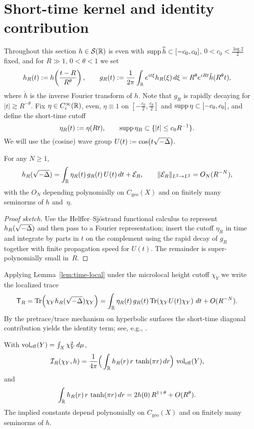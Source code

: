 \section{Short-time kernel and identity contribution}\label{sec:kernel}

Throughout this section $h\in\mathcal{S}(\mathbb{R})$ is even with $\operatorname{supp} \widehat{h}\subset[-c_0,c_0]$, $0<c_0<\tfrac{\log 2}{2}$ fixed, and for $R\gg1$, $0<\theta<1$ we set
\[
h_R(t):=h\!\left(\frac{t-R}{R^\theta}\right),\qquad
g_R(t):=\frac{1}{2\pi}\int_{\mathbb{R}}e^{it\xi}h_R(\xi)\,d\xi
=R^\theta e^{iRt}\check h(R^\theta t),
\]
where $\check h$ is the inverse Fourier transform of $h$.
Note that $g_R$ is rapidly decaying for $|t|\gtrsim R^{-\theta}$.
Fix $\eta\in C_c^\infty(\mathbb{R})$, even, $\eta\equiv1$ on $[-\tfrac{c_0}{2},\tfrac{c_0}{2}]$ and $\operatorname{supp}\eta\subset[-c_0,c_0]$, and define the short-time cutoff
\[
\eta_R(t):=\eta(Rt),\qquad \operatorname{supp} \eta_R \subset \{|t|\le c_0 R^{-1}\}.
\]
We will use the (cosine) wave group $U(t):=\cos\!\big(t\sqrt{-\Delta}\big)$.

\begin{lemma}\label{lem:time-local}
For any $N\ge1$,
\[
h_R(\sqrt{-\Delta})=\int_{\mathbb{R}} \eta_R(t)\, g_R(t)\, U(t)\,dt + \mathcal{E}_R,
\qquad \|\mathcal{E}_R\|_{L^2\to L^2}=O_N(R^{-N}),
\]
with the $O_N$ depending polynomially on $C_{\mathrm{geo}}(X)$ and on finitely many seminorms of $h$ and~$\eta$.
\end{lemma}

\begin{proof}[Proof sketch]
Use the Helffer--Sj\"ostrand functional calculus to represent $h_R(\sqrt{-\Delta})$ and then pass to a Fourier representation; insert the cutoff $\eta_R$ in time and integrate by parts in $t$ on the complement using the rapid decay of $g_R$ together with finite propagation speed for $U(t)$. The remainder is super-polynomially small in~$R$.
\end{proof}

Applying Lemma~\ref{lem:time-local} under the microlocal height cutoff $\chi_Y$ we write the localized trace
\[
\mathsf{T}_R=\mathrm{Tr}\!\left(\chi_Y h_R(\sqrt{-\Delta}) \chi_Y\right)
= \int_{\mathbb{R}}\eta_R(t)\, g_R(t)\, \mathrm{Tr}\!\left(\chi_Y U(t)\chi_Y\right)\,dt + O(R^{-N}).
\]
By the pretrace/trace mechanism on hyperbolic surfaces the short-time diagonal contribution yields the identity term; see, e.g., \cite{hejhal1976,hejhal1983}.

\begin{proposition}\label{prop:identity}
With $\operatorname{vol}_{\mathrm{eff}}(Y)=\int_X \chi_Y^2\,d\mu$,
\[
\mathcal{I}_R(\chi_Y,h)=\frac{1}{4\pi}\Big(\int_{\mathbb{R}} h_R(r)\, r\,\tanh(\pi r)\,dr\Big)\,\operatorname{vol}_{\mathrm{eff}}(Y),
\]
and
\[
\int_{\mathbb{R}} h_R(r)\, r\,\tanh(\pi r)\,dr
= 2h(0)\,R^{1+\theta}+O(R^\theta).
\]
The implied constants depend polynomially on $C_{\mathrm{geo}}(X)$ and on finitely many seminorms of $h$.
\end{proposition}

